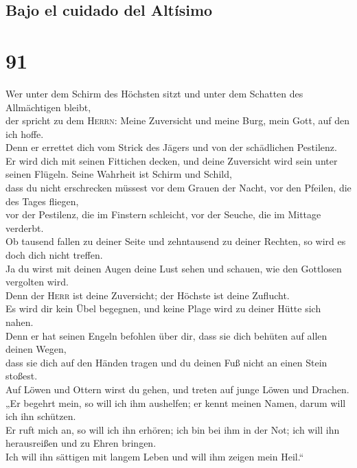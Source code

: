\hypertarget{bajo-el-cuidado-del-altuxedsimo}{%
\subsection{Bajo el cuidado del
Altísimo}\label{bajo-el-cuidado-del-altuxedsimo}}

\hypertarget{section-90}{%
\section{91}\label{section-90}}

 Wer unter dem Schirm des Höchsten sitzt und unter dem
Schatten des Allmächtigen bleibt,\\
 der spricht zu dem \textsc{Herrn}: Meine Zuversicht und
meine Burg, mein Gott, auf den ich hoffe.\\
 Denn er errettet dich vom Strick des Jägers und von der
schädlichen Pestilenz.\\
 Er wird dich mit seinen Fittichen decken, und deine
Zuversicht wird sein unter seinen Flügeln. Seine Wahrheit ist Schirm und
Schild,\\
 dass du nicht erschrecken müssest vor dem Grauen der
Nacht, vor den Pfeilen, die des Tages fliegen,\\
 vor der Pestilenz, die im Finstern schleicht, vor der
Seuche, die im Mittage verderbt.\\
 Ob tausend fallen zu deiner Seite und zehntausend zu
deiner Rechten, so wird es doch dich nicht treffen.\\
 Ja du wirst mit deinen Augen deine Lust sehen und
schauen, wie den Gottlosen vergolten wird.\\
 Denn der \textsc{Herr} ist deine Zuversicht; der Höchste
ist deine Zuflucht.\\
 Es wird dir kein Übel begegnen, und keine Plage wird zu
deiner Hütte sich nahen.\\
 Denn er hat seinen Engeln befohlen über dir, dass sie
dich behüten auf allen deinen Wegen,\\
 dass sie dich auf den Händen tragen und du deinen Fuß
nicht an einen Stein stoßest.\\
 Auf Löwen und Ottern wirst du gehen, und treten auf
junge Löwen und Drachen.\\
 „Er begehrt mein, so will ich ihm aushelfen; er kennt
meinen Namen, darum will ich ihn schützen.\\
 Er ruft mich an, so will ich ihn erhören; ich bin bei
ihm in der Not; ich will ihn herausreißen und zu Ehren bringen.\\
 Ich will ihn sättigen mit langem Leben und will ihm
zeigen mein Heil.``

